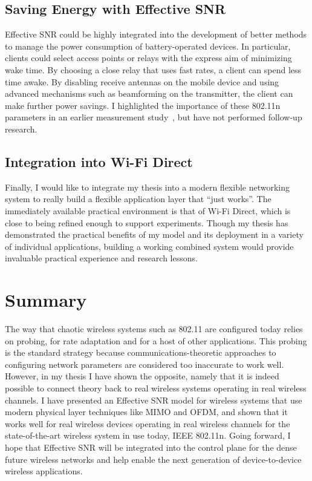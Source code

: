 \subsection{Saving Energy with Effective SNR}
Effective SNR could be highly integrated into the development of better methods to manage the power consumption of battery-operated devices. In particular, clients could select access points or relays with the express aim of minimizing wake time. By choosing a close relay that uses fast rates, a client can spend less time awake. By disabling receive antennas on the mobile device and using advanced mechanisms such as beamforming on the transmitter, the client can make further power savings. I highlighted the importance of these 802.11n parameters in an earlier measurement study~\cite{Halperin_Power}, but have not performed follow-up research.

\subsection{Integration into Wi-Fi Direct}
Finally, I would like to integrate my thesis into a modern flexible networking system to really build a flexible application layer that ``just works''. The immediately available practical environment is that of Wi-Fi Direct, which is close to being refined enough to support experiments. Though my thesis has demonstrated the practical benefits of my model and its deployment in a variety of individual applications, building a working combined system would provide invaluable practical experience and research lessons.

\section{Summary}
The way that chaotic wireless systems such as 802.11 are configured today relies on probing, for rate adaptation and for a host of other applications. This probing is the standard strategy because communications-theoretic approaches to configuring network parameters are considered too inaccurate to work well. However, in my thesis I have shown the opposite, namely that it is indeed possible to connect theory back to real wireless systems operating in real wireless channels. I have presented an Effective SNR model for wireless systems that use modern physical layer techniques like MIMO and OFDM, and shown that it works well for real wireless devices operating in real wireless channels for the state-of-the-art wireless system in use today, IEEE 802.11n. Going forward, I hope that Effective SNR will be integrated into the control plane for the dense future wireless networks and help enable the next generation of device-to-device wireless applications.

\ifx\mainfile\undefined

\fi

